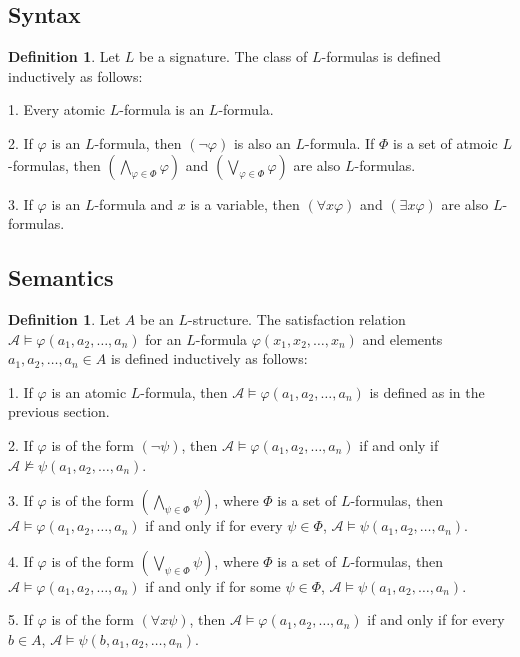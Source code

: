 \documentclass[12pt, reqno]{amsart}
\theoremstyle{definition}
\newtheorem{definition}[theorem]{Definition}
\theoremstyle{remark}
\numberwithin{equation}{section}
\begin{document}
{\subsection{Syntax}

\begin{definition}
    Let $L$ be a signature. The class of $L$-formulas is defined inductively as follows:

    1. Every atomic $L$-formula is an $L$-formula.

    2. If $\varphi$ is an $L$-formula, then $(\neg \varphi)$ is also an $L$-formula. If $\Phi$ is a set of atmoic $L$-formulas, then $(\bigwedge_{\varphi\in \Phi} \varphi)$ and $(\bigvee_{\varphi\in \Phi} \varphi)$ are also $L$-formulas.

    3. If $\varphi$ is an $L$-formula and $x$ is a variable, then $(\forall x \varphi)$ and $(\exists x \varphi)$ are also $L$-formulas.
\end{definition}

\subsection{Semantics}

\begin{definition}
    Let $A$ be an $L$-structure. The satisfaction relation $\mathcal{A} \models \varphi(a_1, a_2, \ldots, a_n)$ for an $L$-formula $\varphi(x_1, x_2, \ldots, x_n)$ and elements $a_1, a_2, \ldots, a_n \in A$ is defined inductively as follows:

    1. If $\varphi$ is an atomic $L$-formula, then $\mathcal{A} \models \varphi(a_1, a_2, \ldots, a_n)$ is defined as in the previous section.

    2. If $\varphi$ is of the form $(\neg \psi)$, then $\mathcal{A} \models \varphi(a_1, a_2, \ldots, a_n)$ if and only if $\mathcal{A} \not\models \psi(a_1, a_2, \ldots, a_n)$.

    3. If $\varphi$ is of the form $(\bigwedge_{\psi\in \Phi} \psi)$, where $\Phi$ is a set of $L$-formulas, then $\mathcal{A} \models \varphi(a_1, a_2, \ldots, a_n)$ if and only if for every $\psi \in \Phi$, $\mathcal{A} \models \psi(a_1, a_2, \ldots, a_n)$.

    4. If $\varphi$ is of the form $(\bigvee_{\psi\in \Phi} \psi)$, where $\Phi$ is a set of $L$-formulas, then $\mathcal{A} \models \varphi(a_1, a_2, \ldots, a_n)$ if and only if for some $\psi \in \Phi$, $\mathcal{A} \models \psi(a_1, a_2, \ldots, a_n)$.

    5. If $\varphi$ is of the form $(\forall x \psi)$, then $\mathcal{A} \models \varphi(a_1, a_2, \ldots, a_n)$ if and only if for every $b \in A$, $\mathcal{A} \models \psi(b, a_1, a_2, \ldots, a_n)$.


\end{definition}}
\end{document}
